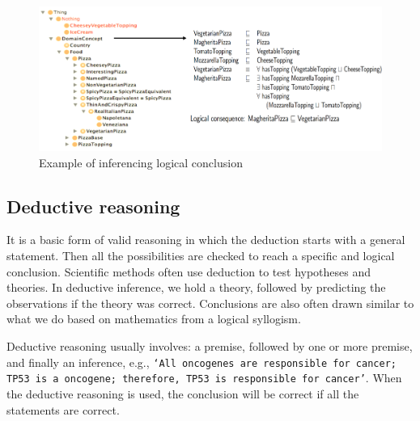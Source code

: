 \begin{figure}[h]
	\centering
	\includegraphics[scale=0.8]{images/reasoning.png}
	\caption{Example of inferencing logical conclusion} 
	\label{fig:pizza1}
	\vspace{-2mm}
\end{figure}

\subsection{Deductive reasoning} 
It is a basic form of valid reasoning in which the deduction starts with a general statement. Then all the possibilities are checked to reach a specific and logical conclusion. Scientific methods often use deduction to test hypotheses and theories. In deductive inference, we hold a theory, followed by predicting the observations if the theory was correct. Conclusions are also often drawn similar to what we do based on mathematics from a logical syllogism. 

Deductive reasoning usually involves: a premise, followed by one or more premise, and finally an inference, e.g., \texttt{`All oncogenes are responsible for cancer; TP53 is a oncogene; therefore, TP53 is responsible for cancer'}. When the deductive reasoning is used, the conclusion will be correct if all the statements are correct. 


